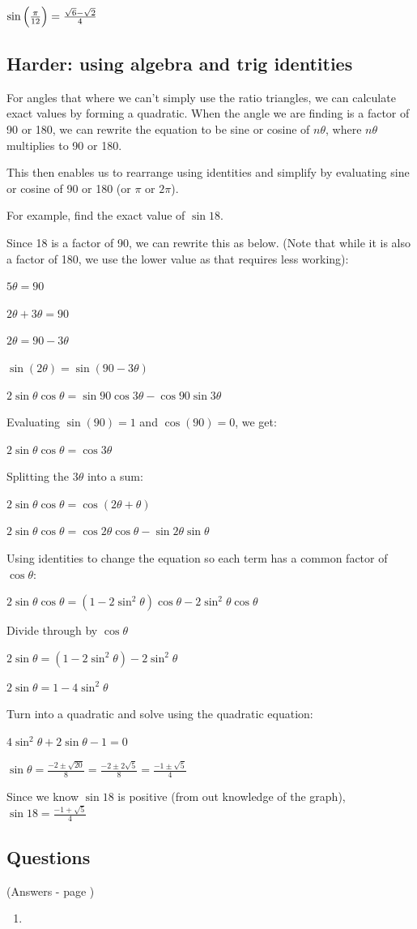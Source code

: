 \documentclass[../main.tex]{subfiles}
\begin{document}
$\sin{\Bigl(\frac{\pi}{12}\Bigr)}=\frac{\sqrt{6}-\sqrt{2}}{4}$
\pagebreak
\subsection*{Harder: using algebra and trig identities}
For angles that where we can't simply use the ratio triangles, we can calculate exact values by forming a quadratic. When the angle we are finding is a factor of 90 or 180, we can rewrite the equation to be sine or cosine of $n\theta$, where $n\theta$ multiplies to 90 or 180.

This then enables us to rearrange using identities and simplify by evaluating sine or cosine of 90 or 180 (or $\pi$ or $2\pi$).

For example, find the exact value of $\sin{18}$.

Since 18 is a factor of 90, we can rewrite this as below. (Note that while it is also a factor of 180, we use the lower value as that requires less working):

$5\theta=90$

$2\theta +3\theta=90$

$2\theta = 90-3\theta$

$\sin{(2\theta)}=\sin{(90-3\theta)}$

$2\sin{\theta}\cos{\theta}=\sin{90}\cos{3\theta}-\cos{90}\sin{3\theta}$

Evaluating $\sin{(90)}=1$ and $\cos{(90)}=0$, we get:

$2\sin{\theta}\cos{\theta}=\cos{3\theta}$

Splitting the $3\theta$ into a sum:

$2\sin{\theta}\cos{\theta}=\cos{(2\theta + \theta)}$

$2\sin{\theta}\cos{\theta}=\cos{2\theta}\cos{\theta}-\sin{2\theta}\sin{\theta}$

Using identities to change the equation so each term has a common factor of $\cos{\theta}$:

$2\sin{\theta}\cos{\theta}=(1-2\sin^2{\theta})\cos{\theta}-2\sin^2{\theta}\cos{\theta}$

Divide through by $\cos{\theta}$

$2\sin{\theta}=(1-2\sin^2{\theta})-2\sin^2{\theta}$

$2\sin{\theta}=1-4\sin^2{\theta}$

Turn into a quadratic and solve using the quadratic equation:

$4\sin^2{\theta}+2\sin{\theta}-1=0$

$\sin{\theta}=\frac{-2\pm \sqrt{20}}{8}=\frac{-2\pm 2\sqrt{5}}{8}=\frac{-1\pm \sqrt{5}}{4}$

Since we know $\sin{18}$ is positive (from out knowledge of the graph), $\sin{18}=\frac{-1+\sqrt{5}}{4}$

\pagebreak

\subsection*{Questions} 
\label{Exact trig values}
(Answers - page {\pageref{Exact trig values answers}})
\begin{enumerate}
    \item 



\end{enumerate}
\end{document}
